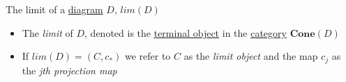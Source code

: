 The limit of a \hyperref[D3.51]{diagram} $D$, $lim(D)$

\begin{itemize}
    \item  The \emph{limit} of $D$, denoted is the \hyperref[D3.79]{terminal object} in the \hyperref[D3.6]{category} $\mathbf{Cone}(D)$
    \item If $lim(D)=(C,c_*)$ we refer to $C$ as the \emph{limit object} and the map $c_j$ as the \emph{jth projection map}

  \end{itemize}
